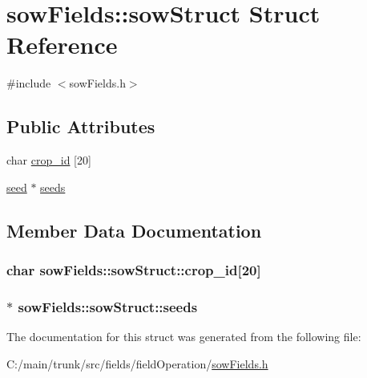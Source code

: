 \hypertarget{structsow_fields_1_1sow_struct}{
\section{sowFields::sowStruct Struct Reference}
\label{structsow_fields_1_1sow_struct}
}


{\ttfamily \#include $<$sowFields.h$>$}\subsection*{Public Attributes}
\begin{DoxyCompactItemize}
\item 
char \hyperlink{structsow_fields_1_1sow_struct_a7bdf516f70dffda05696421951342fdb}{crop\_\-id} \mbox{[}20\mbox{]}
\item 
\hyperlink{classseed}{seed} $\ast$ \hyperlink{structsow_fields_1_1sow_struct_ad51253566c0dbe73f275f3173655e73c}{seeds}
\end{DoxyCompactItemize}


\subsection{Member Data Documentation}
\hypertarget{structsow_fields_1_1sow_struct_a7bdf516f70dffda05696421951342fdb}{
\subsubsection[{crop\_\-id}]{\setlength{\rightskip}{0pt plus 5cm}char {\bf sowFields::sowStruct::crop\_\-id}\mbox{[}20\mbox{]}}}
\label{structsow_fields_1_1sow_struct_a7bdf516f70dffda05696421951342fdb}
\hypertarget{structsow_fields_1_1sow_struct_ad51253566c0dbe73f275f3173655e73c}{
\subsubsection[{seeds}]{$\ast$ {\bf sowFields::sowStruct::seeds}}}
\label{structsow_fields_1_1sow_struct_ad51253566c0dbe73f275f3173655e73c}


The documentation for this struct was generated from the following file:\begin{DoxyCompactItemize}
\item 
C:/main/trunk/src/fields/fieldOperation/\hyperlink{sow_fields_8h}{sowFields.h}\end{DoxyCompactItemize}
